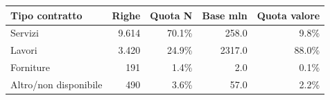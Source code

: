 \begin{tabular}{lrrrr}
\toprule
Tipo contratto & Righe & Quota N & Base mln \texteuro{} & Quota valore \\
\midrule
Servizi & 9.614 & 70.1\% & 258.0 & 9.8\% \\
Lavori & 3.420 & 24.9\% & 2317.0 & 88.0\% \\
Forniture & 191 & 1.4\% & 2.0 & 0.1\% \\
Altro/non disponibile & 490 & 3.6\% & 57.0 & 2.2\% \\
\bottomrule
\end{tabular}
